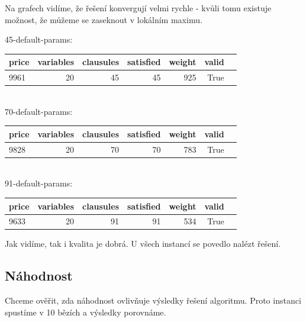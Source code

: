 \documentclass[a4paper,10pt,twocolumn]{article}
\begin{document}
\begin{itemize}
\begin{itemize}
Na grafech vidíme, že řešení konvergují velmi rychle - kvůli tomu existuje možnost, že můžeme se zaseknout v lokálním maximu.

45-default-params: \\
\begin{tabular}{lrrrrrl}
\toprule
       price &  variables &  clausules &  satisfied &  weight &  valid \\
\hline

\midrule
 9961 &         20 &         45 &         45 &     925 &   True \\
\bottomrule
\end{tabular}
\\


70-default-params: \\
\begin{tabular}{lrrrrrl}
\toprule
       price &  variables &  clausules &  satisfied &  weight &  valid \\
\midrule
\hline

9828 &         20 &         70 &         70 &     783 &   True \\
\bottomrule
\end{tabular}



\\



91-default-params: \\
\begin{tabular}{lrrrrrl}
\toprule
    price &  variables &  clausules &  satisfied &  weight &  valid \\
\midrule
\hline

 9633 &         20 &         91 &         91 &     534 &   True \\
\bottomrule
\end{tabular}


Jak vidíme, tak i kvalita je dobrá. U všech instancí se povedlo nalézt řešení.



\subsection{Náhodnost}

Chceme ověřit, zda náhodnost ovlivňuje výsledky řešení algoritmu. Proto instanci spustíme v 10 bězích a výsledky porovnáme.



\end{itemize}
\end{itemize}
\end{document}
